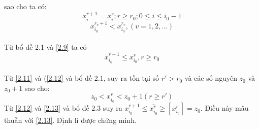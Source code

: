 \documentclass[12pt,a4paper]{report}
\begin{document}
    sao cho ta có:\\
   \begin{equation}\label{2.10}
       x_i^{r+1}=x_i^r; r \ge r_0; 0\le i\le i_0-1
   \end{equation} 
    \begin{equation}\label{2.11}
        x_{i_0}^{r_v+1} <x_{i_0}^{r_v}, (v=1,2,...)
    \end{equation}  \\
    Từ bổ đề 2.1 và \eqref{2.9} ta có\\
    \begin{equation}\label{2.12}
        x_{i_0}^{r+1} \le x_{i_0}^r, r\ge r_0
    \end{equation}\\
    Từ \eqref{2.11} và (\eqref{2.12} và bổ đề 2.1, suy ra tồn tại số $r' >r_0$ và các số nguyên $z_0$ và $z_0+1$ sao cho:\\
    \begin{equation}\label{2.13}
        z_0<x_{i_0}^r< z_0+1 (r \ge r')
    \end{equation}
    Từ \eqref{2.12} và \eqref{2.13} và bổ đề 2.3 suy ra $x_{i_0}^{r+1}\le \overline{x_{i_0}^r}\ge [x_{i_0}^r]=z_0$. Điều này mâu thuẫn với \eqref{2.13}.
    Định lí được chứng minh.
\end{document}
